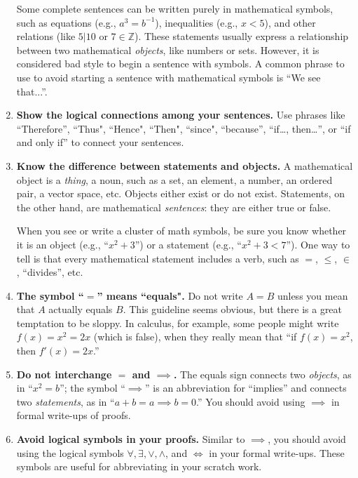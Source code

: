\begin{enumerate}
Some complete sentences can be written purely in mathematical symbols, such as equations (e.g., $a^3=b^{-1}$), inequalities (e.g., $x<5$), and other relations (like $5\big|10$ or $7\in\mathbb{Z}$). These statements usually express a relationship between two mathematical \emph{objects}, like numbers or sets.  However, it is considered bad style to begin a sentence with symbols.  A common phrase to use to avoid starting a sentence with mathematical symbols is ``We see that...''.

\item \textbf{Show the logical connections among your sentences.}
Use phrases like ``Therefore'', ``Thus", ``Hence", ``Then", ``since", ``because'', ``if\ldots, then\ldots'', or ``if and only if'' to connect your sentences.
  
\item \textbf{Know the difference between statements and objects.}
A mathematical object is a \emph{thing}, a noun, such as a set, an element, a number, an ordered pair, a vector space, etc. Objects either exist or do not exist. Statements, on the other hand, are mathematical \emph{sentences}:  they are either true or false.
        
When you see or write a cluster of math symbols, be sure you know whether it is an object (e.g., ``$x^2+3$'') or a statement (e.g., ``$x^2+3<7$''). One way to tell is that every mathematical statement includes a verb, such as $=$, $\leq$, $\in$, ``divides'', etc.
        
\item \textbf{The symbol ``$=$'' means ``equals".}
Do not write $A=B$ unless you mean that $A$ actually equals $B$. This guideline seems obvious, but there is a great temptation to be sloppy.  In calculus, for example, some people might write $f(x)=x^{2}=2x$ (which is false), when they really mean that ``if $f(x)=x^{2}$, then $f'(x)=2x$.''

\item \textbf{Do not interchange ${=}$ and ${\implies}$.}
The equals sign connects two \emph{objects}, as in ``$x^2=b$''; the symbol ``$\implies$'' is an abbreviation for ``implies'' and connects two \emph{statements}, as in ``$a+b=a \implies b=0$.''  You should avoid using $\implies$ in formal write-ups of proofs.

\item \textbf{Avoid logical symbols in your proofs.}  
Similar to $\implies$, you should avoid using the logical symbols $\forall, \exists, \vee, \wedge$, and $\iff$ in your formal write-ups.  These symbols are useful for abbreviating in your scratch work. 


\end{enumerate}
